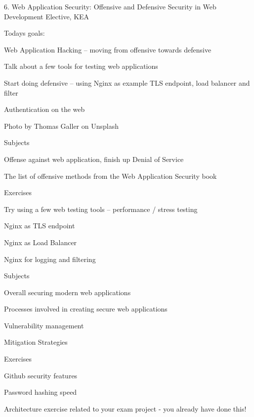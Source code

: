 \documentclass[Screen16to9,17pt]{foils}
\begin{document}
\mytitlepage
{6. Web Application Security: Offensive and Defensive}
{Security in Web Development Elective, KEA}




Todays goals:
\begin{list2}
\item Web Application Hacking -- moving from offensive towards defensive
\item Talk about a few tools for testing web applications
\item Start doing defensive -- using Nginx as example TLS endpoint, load balancer and filter
\item Authentication on the web
\end{list2}

Photo by Thomas Galler on Unsplash




\begin{list1}
\item Subjects
\begin{list2}
\item Offense against web application, finish up Denial of Service
\item The list of offensive methods from the Web Application Security book
\end{list2}
\item Exercises
\begin{list2}
\item Try using a few web testing tools -- performance / stress testing
\item Nginx as TLS endpoint
\item Nginx as Load Balancer
\item Nginx for logging and filtering
\end{list2}
\end{list1}


\begin{list1}
\item Subjects
\begin{list2}
\item Overall securing modern web applications
\item Processes involved in creating secure web applications
\item Vulnerability management
\item Mitigation Strategies
\end{list2}
\item Exercises
\begin{list2}
\item Github security features
\item Password hashing speed
\item Architecture exercise related to your exam project - you already have done this!
\end{list2}
\end{list1}
\end{document}
